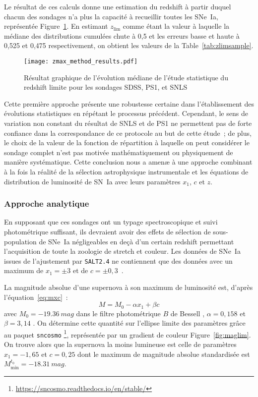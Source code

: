 \documentclass[../main/main.tex]{subfiles}
\begin{document}
Le résultat de ces calculs donne une estimation du redshift à partir duquel
chacun des sondages n'a plus la capacité à recueillir toutes les SNe~Ia,
représentée Figure~\ref{fig:zmax_method_results}. En estimant $z_{\lim}$ comme
étant la valeur à laquelle la médiane des distributions cumulées chute à 0,5 et
les erreurs basse et haute à 0,525 et 0,475 respectivement, on obtient les
valeurs de la Table~\ref{tab:zlimsample}.

\begin{figure}[ht]
    \centering
    \texttt{[image: zmax\_method\_results.pdf]}
    \captionsetup{justification=centering}
    \caption{Résultat graphique de l'évolution médiane de l'étude statistique du
    redshift limite pour les sondages SDSS, PS1, et SNLS}
    \label{fig:zmax_method_results}
\end{figure}

Cette première approche présente une robustesse certaine dans l'établissement
des évolutions statistiques en répétant le processus précédent. Cependant, le
sens de variation non constant du résultat de SNLS et de PS1 ne permettent pas
de forte confiance dans la correspondance de ce protocole au but de cette
étude~; de plus, le choix de la valeur de la fonction de répartition à laquelle
on peut considérer le sondage complet n'est pas motivée mathématiquement ou
physiquement de manière systématique. Cette conclusion nous a amenæ à une
approche combinant à la fois la réalité de la sélection astrophysique
instrumentale et les équations de distribution de luminosité de SN~Ia avec leurs
paramètres $x_1$, $c$ et $z$.

\subsubsection{Approche analytique}\label{sssec:maglim}

En supposant que ces sondages ont un typage spectroscopique et suivi
photométrique suffisant, ils devraient avoir des effets de sélection de
sous-population de SNe~Ia négligeables en deçà d'un certain redshift permettant
l'acquisition de toute la zoologie de stretch et couleur. Les données de SNe~Ia
issues de l'ajustement par \texttt{SALT2.4} ne contiennent que des données avec
un maximum de $x_1 = \pm 3$ et de $c = \pm 0,3$~\citep[][cf
Section~\ref{ssec:salt}]{guy2007, betoule2014}.

La magnitude absolue d'une supernova à son maximum de luminosité est, d'après
l'équation~\ref{eq:mxc}~:
\begin{equation*}
    M = M_0 -\alpha x_1 + \beta c
\end{equation*}
avec $M_0 = \SI{-19,36}{mag}$ dans le filtre photométrique $B$ de Bessell
\citep{kessler2009a, scolnic2014}, $\alpha=0,158$ et $\beta=3,14$
\citep[Table 7,][]{scolnic2018}. On détermine cette quantité sur l'ellipse
limite des paramètres grâce au paquet \texttt{sncosmo}
\footnote{\href{https://sncosmo.readthedocs.io/en/stable/}
{https://sncosmo.readthedocs.io/en/stable/}}, représentée par un gradient de
couleur Figure~\ref{fig:maglim}. On trouve alors que la supernova la moins
lumineuse est celle de paramètres $x_1 = -1,65$ et $c = 0,25$ dont le maximum de
magnitude absolue standardisée est $M_{\min}^{t_0}=\SI{-18,31}{mag}$.
\end{document}
